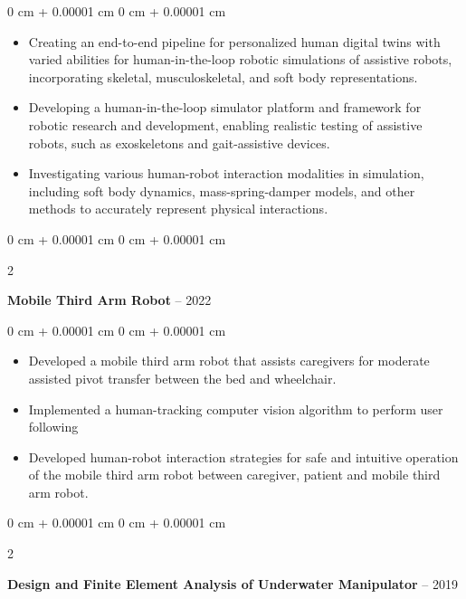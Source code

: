 \documentclass[10pt, letterpaper]{article}
\newenvironment{highlights}{
    \begin{itemize}[
        topsep=0.10 cm,
        parsep=0.10 cm,
        partopsep=0pt,
        itemsep=0pt,
        leftmargin=0 cm + 10pt
    ]
}{
    \end{itemize}
} %
\newenvironment{onecolentry}{
    \begin{adjustwidth}{
        0 cm + 0.00001 cm
    }{
        0 cm + 0.00001 cm
    }
}{
    \end{adjustwidth}
} %
\newenvironment{twocolentry}[2][]{
    \onecolentry
    \def\secondColumn{#2}
    \setcolumnwidth{\fill, 4.5 cm}
    \begin{paracol}{2}
}{
    \switchcolumn \raggedleft \secondColumn
    \end{paracol}
    \endonecolentry
} %
\begin{document}
        \vspace{0.10 cm}
        \begin{onecolentry}
            \begin{highlights}
                \item Creating an end-to-end pipeline for personalized human digital twins with varied abilities for human-in-the-loop robotic simulations of assistive robots, incorporating skeletal, musculoskeletal, and soft body representations.
                \item Developing a human-in-the-loop simulator platform and framework for robotic research and development, enabling realistic testing of assistive robots, such as exoskeletons and gait-assistive devices.
                \item Investigating various human-robot interaction modalities in simulation, including soft body dynamics, mass-spring-damper models, and other methods to accurately represent physical interactions.
            \end{highlights}
        \end{onecolentry}


        \vspace{0.2 cm}

        \begin{twocolentry}{
            2020 -- 2022
        }
            \textbf{Mobile Third Arm Robot}\end{twocolentry}

        \vspace{0.10 cm}
        \begin{onecolentry}
            \begin{highlights}
                \item Developed a mobile third arm robot that assists caregivers for moderate assisted pivot transfer between the bed and wheelchair.
                \item Implemented a human-tracking computer vision algorithm to perform user following
                \item Developed human-robot interaction strategies for safe and intuitive operation of the mobile third arm robot between caregiver, patient and mobile third arm robot.
            \end{highlights}
        \end{onecolentry}


        \vspace{0.2 cm}

        \begin{twocolentry}{
            2018 -- 2019
        }
            \textbf{Design and Finite Element Analysis of Underwater Manipulator}\end{twocolentry}
\end{document}
